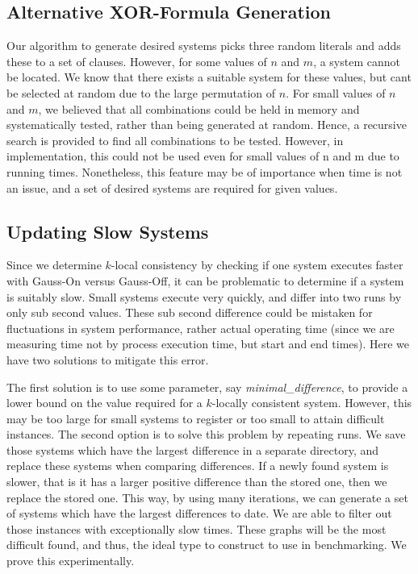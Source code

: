 \subsection{Alternative XOR-Formula Generation}
Our algorithm to generate desired systems picks three random literals and adds these to a set of clauses. However, for some values of $n$ and $m$, a system cannot be located. We know that there exists a suitable system for these values, but cant be selected at random due to the large permutation of $n$. For small values of $n$ and $m$, we believed that all combinations could be held in memory and systematically tested, rather than being generated at random. Hence, a recursive search is provided to find all combinations to be tested. However, in implementation, this could not be used even for small values of n and m due to running times. Nonetheless, this feature may be of importance when time is not an issue, and a set of desired systems are required for given values.

\subsection{Updating Slow Systems}
Since we determine $k$-local consistency by checking if one system executes faster with Gauss-On versus Gauss-Off, it can be problematic to determine if a system is suitably slow. Small systems execute very quickly, and differ into two runs by only sub second values. These sub second difference could be mistaken for fluctuations in system performance, rather actual operating time (since we are measuring time not by process execution time, but start and end times). Here we have two solutions to mitigate this error.
\par
The first solution is to use some parameter, say \emph{minimal\_difference}, to provide a lower bound on the value required for a $k$-locally consistent system. However, this may be too large for small systems to register or too small to attain difficult instances. The second option is to solve this problem by repeating runs. We save those systems which have the largest difference in a separate directory, and replace these systems when comparing differences. If a newly found system is slower, that is it has a larger positive difference than the stored one, then we replace the stored one. This way, by using many iterations, we can generate a set of systems which have the largest differences to date. We are able to filter out those instances with exceptionally slow times. These graphs will be the most difficult found, and thus, the ideal type to construct to use in benchmarking. We prove this experimentally.

